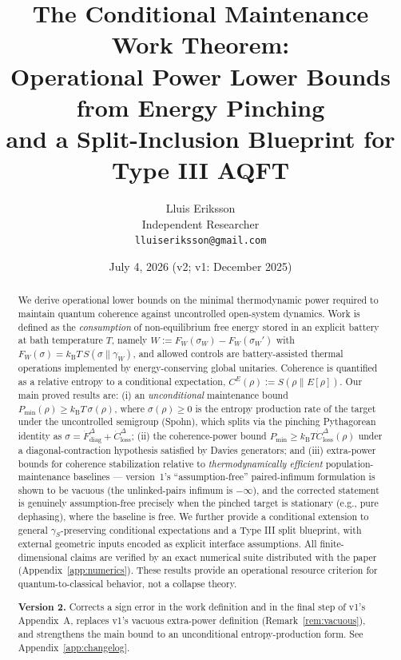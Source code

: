 \documentclass[11pt,a4paper]{article}
\title{The Conditional Maintenance Work Theorem:\\
Operational Power Lower Bounds from Energy Pinching\\
and a Split-Inclusion Blueprint for Type III AQFT}
\author{Lluis Eriksson\\ \small Independent Researcher\\
\small \texttt{lluiseriksson@gmail.com}}
\date{July 4, 2026 \quad (v2; v1: December 2025)}
\theoremstyle{plain}
\theoremstyle{definition}
\theoremstyle{remark}
\newcommand{\kB}{k_{\mathrm{B}}}
\newcommand{\Pmin}{P_{\min}}
\newcommand{\Closs}{\dot{C}^{\Delta}_{\mathrm{loss}}}
\newcommand{\Fdiag}{\dot{F}^{\Delta}_{\mathrm{diag}}}
\begin{document}
\maketitle

\begin{abstract}
We derive operational lower bounds on the minimal thermodynamic power required
to maintain quantum coherence against uncontrolled open-system dynamics. Work is
defined as the \emph{consumption} of non-equilibrium free energy stored in an
explicit battery at bath temperature $T$, namely $W := F_W(\sigma_W) -
F_W(\sigma_W')$ with $F_W(\sigma) = \kB T\, S(\sigma\|\gamma_W)$, and allowed
controls are battery-assisted thermal operations implemented by
energy-conserving global unitaries. Coherence is quantified as a relative
entropy to a conditional expectation, $C^E(\rho) := S(\rho\|E[\rho])$. Our main
proved results are: (i) an \emph{unconditional} maintenance bound
$\Pmin(\rho) \ge \kB T\,\sigma(\rho)$, where $\sigma(\rho) \ge 0$ is the entropy
production rate of the target under the uncontrolled semigroup (Spohn), which
splits via the pinching Pythagorean identity as
$\sigma = \Fdiag + \Closs$; (ii) the coherence-power bound
$\Pmin \ge \kB T \Closs(\rho)$ under a diagonal-contraction hypothesis satisfied
by Davies generators; and (iii) extra-power bounds for coherence stabilization
relative to \emph{thermodynamically efficient} population-maintenance baselines
--- version~1's ``assumption-free'' paired-infimum formulation is shown to be
vacuous (the unlinked-pairs infimum is $-\infty$), and the corrected statement
is genuinely assumption-free precisely when the pinched target is stationary
(e.g., pure dephasing), where the baseline is free. We further provide a
conditional extension to general $\gamma_S$-preserving conditional expectations
and a Type III split blueprint, with external geometric inputs encoded as
explicit interface assumptions. All finite-dimensional claims are verified by
an exact numerical suite distributed with the paper
(Appendix~\ref{app:numerics}). These results provide an operational resource
criterion for quantum-to-classical behavior, not a collapse theory.

\medskip
\noindent\textbf{Version 2.} Corrects a sign error in the work definition and
in the final step of v1's Appendix~A, replaces v1's vacuous extra-power
definition (Remark~\ref{rem:vacuous}), and strengthens the main bound to an
unconditional entropy-production form. See Appendix~\ref{app:changelog}.
\end{abstract}
\end{document}
